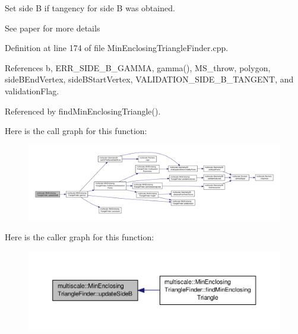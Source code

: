 Set side B if tangency for side B was obtained. 

See paper for more details 

Definition at line 174 of file Min\-Enclosing\-Triangle\-Finder.\-cpp.



References b, E\-R\-R\-\_\-\-S\-I\-D\-E\-\_\-\-B\-\_\-\-G\-A\-M\-M\-A, gamma(), M\-S\-\_\-throw, polygon, side\-B\-End\-Vertex, side\-B\-Start\-Vertex, V\-A\-L\-I\-D\-A\-T\-I\-O\-N\-\_\-\-S\-I\-D\-E\-\_\-\-B\-\_\-\-T\-A\-N\-G\-E\-N\-T, and validation\-Flag.



Referenced by find\-Min\-Enclosing\-Triangle().



Here is the call graph for this function\-:\nopagebreak
\begin{figure}[H]
\begin{center}
\leavevmode
\includegraphics[width=350pt]{classmultiscale_1_1MinEnclosingTriangleFinder_ab25b3b5dbe05cb06e83a49cd28b3116f_cgraph}
\end{center}
\end{figure}




Here is the caller graph for this function\-:\nopagebreak
\begin{figure}[H]
\begin{center}
\leavevmode
\includegraphics[width=350pt]{classmultiscale_1_1MinEnclosingTriangleFinder_ab25b3b5dbe05cb06e83a49cd28b3116f_icgraph}
\end{center}
\end{figure}


